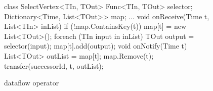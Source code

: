 \begin{figure}[t!]
\begin{numcodejava}
class SelectVertex<TIn, TOut> {
  Func<TIn, TOut> selector;
  Dictionary<Time, List<TOut>> map;
  ...
  void onReceive(Time t, List<TIn> inList) {
    if (!map.ContainsKey(t))
       map[t] = new List<TOut>();
    foreach (TIn input in inList) {
      TOut output = selector(input);
      map[t].add(output);
    }
  }
  void onNotify(Time t) {
     List<TOut> outList = map[t];
     map.Remove(t);
     transfer(successorId, t, outList); 
  }
}
\end{numcodejava}
\caption{ dataflow operator}
\label{fig:motivating-eg}
\vspace*{-0.2in}
\end{figure}
